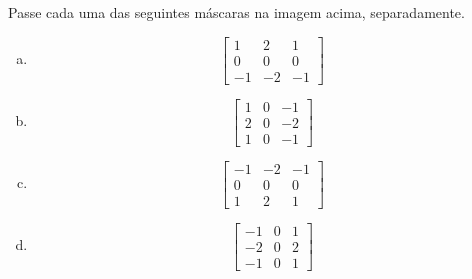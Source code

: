\documentclass[12pt]{article}
\begin{document}
Passe cada uma das seguintes máscaras na imagem acima, separadamente.

\begin{enumerate}[a)]

\item

\[
\begin{bmatrix}
 1 &  2 &  1\\
 0 &  0 &  0\\
-1 & -2 & -1
\end{bmatrix}
\]

\item

\[
\begin{bmatrix}
 1 &  0 & -1\\
 2 &  0 & -2\\
 1 &  0 & -1
\end{bmatrix}
\]




\item

\[
\begin{bmatrix}
-1 & -2 & -1\\
 0 &  0 &  0\\
 1 &  2 &  1
\end{bmatrix}
\]

\item

\[
\begin{bmatrix}
-1 &  0 &  1\\
-2 &  0 &  2\\
-1 &  0 &  1
\end{bmatrix}
\]


\end{enumerate}
\end{document}
